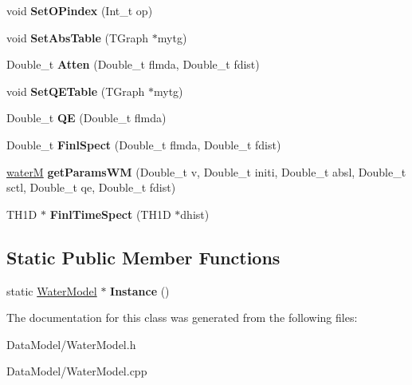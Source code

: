 \begin{DoxyCompactItemize}
\item 
\hypertarget{classWaterModel_a8370e53fc75e530c5c5132073fe94c94}{
void {\bfseries SetOPindex} (Int\_\-t op)}
\label{classWaterModel_a8370e53fc75e530c5c5132073fe94c94}

\item 
\hypertarget{classWaterModel_a027b9c8a50d0ee07e710f6c5330878f0}{
void {\bfseries SetAbsTable} (TGraph $\ast$mytg)}
\label{classWaterModel_a027b9c8a50d0ee07e710f6c5330878f0}

\item 
\hypertarget{classWaterModel_a75f300853d532a883fa1668707d6577b}{
Double\_\-t {\bfseries Atten} (Double\_\-t flmda, Double\_\-t fdist)}
\label{classWaterModel_a75f300853d532a883fa1668707d6577b}

\item 
\hypertarget{classWaterModel_a2b314a7cab6eafee7a490e604698a9a6}{
void {\bfseries SetQETable} (TGraph $\ast$mytg)}
\label{classWaterModel_a2b314a7cab6eafee7a490e604698a9a6}

\item 
\hypertarget{classWaterModel_a5db1a42335d54bef878e7152b7330b3f}{
Double\_\-t {\bfseries QE} (Double\_\-t flmda)}
\label{classWaterModel_a5db1a42335d54bef878e7152b7330b3f}

\item 
\hypertarget{classWaterModel_a3bf124d715b5003c35e06e763f3bac97}{
Double\_\-t {\bfseries FinlSpect} (Double\_\-t flmda, Double\_\-t fdist)}
\label{classWaterModel_a3bf124d715b5003c35e06e763f3bac97}

\item 
\hypertarget{classWaterModel_afe6ee803b9a5974340282b75e2b4ff27}{
\hyperlink{structWaterModel_1_1waterM}{waterM} {\bfseries getParamsWM} (Double\_\-t v, Double\_\-t initi, Double\_\-t absl, Double\_\-t sctl, Double\_\-t qe, Double\_\-t fdist)}
\label{classWaterModel_afe6ee803b9a5974340282b75e2b4ff27}

\item 
\hypertarget{classWaterModel_a88e50d6c1c114d5e0bda0a4f8864d0ca}{
TH1D $\ast$ {\bfseries FinlTimeSpect} (TH1D $\ast$dhist)}
\label{classWaterModel_a88e50d6c1c114d5e0bda0a4f8864d0ca}

\end{DoxyCompactItemize}
\subsection*{Static Public Member Functions}
\begin{DoxyCompactItemize}
\item 
\hypertarget{classWaterModel_ad75cfcce98d57ef4e84aa120e447f37a}{
static \hyperlink{classWaterModel}{WaterModel} $\ast$ {\bfseries Instance} ()}
\label{classWaterModel_ad75cfcce98d57ef4e84aa120e447f37a}

\end{DoxyCompactItemize}


The documentation for this class was generated from the following files:\begin{DoxyCompactItemize}
\item 
DataModel/WaterModel.h\item 
DataModel/WaterModel.cpp\end{DoxyCompactItemize}
